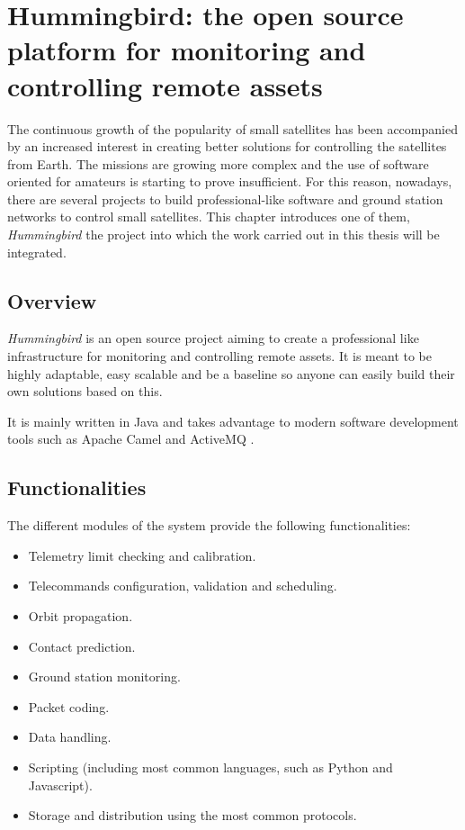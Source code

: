 
\chapter{Hummingbird: the open source platform for monitoring and controlling remote assets}\label{chapter3}

The continuous growth of the popularity of small satellites has been accompanied by an increased interest in creating better solutions for controlling the satellites from Earth. The missions are growing more complex and the use of software oriented for amateurs is starting to prove insufficient. For this reason, nowadays, there are  several projects to build professional-like software and ground station networks to control small satellites. This chapter introduces one of them, \emph{Hummingbird} \citep{HBird} the project into which the work carried out in this thesis will be integrated. 

\section{Overview} 

\emph{Hummingbird} is an open source project aiming to create a professional like infrastructure for monitoring and controlling remote assets. It is meant to be highly adaptable, easy scalable and be a baseline so anyone can easily build their own solutions based on this. 

It is mainly written in Java \cite{Java} and takes advantage to modern software development tools such as Apache Camel \cite{Camel} and ActiveMQ \cite{AMQ}. 
\pagebreak
\section{Functionalities}

The different modules of the system provide the following functionalities: \cite{Elo}

\begin{itemize}
\item Telemetry limit checking and calibration.
\item Telecommands configuration, validation and scheduling.
\item Orbit propagation.
\item Contact prediction.
\item Ground station monitoring.
\item Packet coding.
\item Data handling.
\item Scripting (including most common languages, such as Python and Javascript).
\item Storage and distribution using the most common protocols.

\end{itemize}



